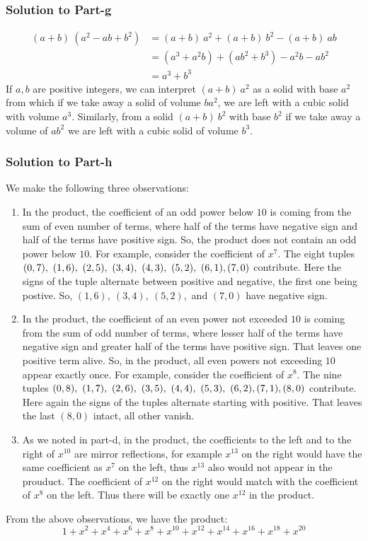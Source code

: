 \documentclass[12pt]{article}
\begin{document}
\subsubsection*{Solution to Part-g}
\begin{displaymath}
	\begin{split}
		(a+b)\ \left( a^2 - ab + b^2 \right) &= (a+b)\ a^2 + (a+b)\ b^2 - (a+b)\ ab\\
											 &= \left(a^3+a^2b\right) + \left( ab^2+b^3 \right) - a^2b-ab^2\\
											 &= a^3+b^3
	\end{split}
\end{displaymath}
If $a,b$ are positive integers, we can interpret $(a+b)\ a^2$ as a solid with base $a^2$ from which if we take away a solid of volume $ba^2$, we are left with a cubic solid with volume $a^3$. Similarly, from a solid $(a+b)\ b^2$ with base $b^2$ if we take away a volume of $ab^2$ we are left with a cubic solid of volume $b^3$.
\pagebreak

\subsubsection*{Solution to Part-h}
We make the following three observations:
\begin{enumerate}
\item In the product, the coefficient of an odd power below $10$ is coming from the sum of even number of terms, where half of the terms have negative sign and half of the terms have positive sign. So, the product does not contain an odd power below $10$. For example, consider the coefficient of $x^7$. The eight tuples $(0, 7),\ (1,6),\ (2,5),\ (3,4),\ (4,3),\ (5,2),\ (6,1),\ \\ (7,0)$ contribute. Here the signs of the tuple alternate between positive and negative, the first one being postive. So, $(1,6),\ (3,4),\ (5,2),$ and $(7,0)$ have negative sign.
\item In the product, the coefficient of an even power not exceeded $10$ is coming from the sum of odd number of terms, where lesser half of the terms have negative sign and greater half of the terms have positive sign. That leaves one positive term alive. So, in the product, all even powers not exceeding $10$ appear exactly once. For example, consider the coefficient of $x^8$. The nine tuples $(0,8),\ (1,7),\ (2,6),\ (3,5),\ (4,4),\ (5,3),\ (6,2),\\(7,1),(8,0)$ contribute. Here again the signs of the tuples alternate starting with positive. That leaves the last $(8,0)$ intact, all other vanish.
\item As we noted in part-d, in the product, the coefficients to the left and to the right of $x^{10}$ are mirror reflections, for example $x^{13}$ on the right would have the same coefficient as $x^7$ on the left, thus $x^{13}$ also would not appear in the prouduct. The coefficient of $x^{12}$ on the right would match with the coefficient of $x^{8}$ on the left. Thus there will be exactly one $x^{12}$ in the product. 
\end{enumerate}
From the above observations, we have the product:
\[
1 + x^2 + x^4 + x^6 + x^8 + x^{10} + x^{12} + x^{14} + x^{16} + x^{18} + x^{20}
\]
\end{document}
